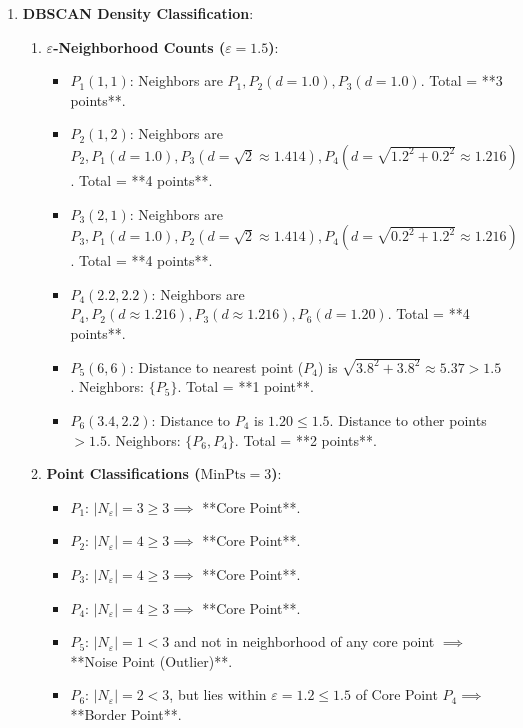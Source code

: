 \begin{enumerate}
    \item \textbf{DBSCAN Density Classification}:
    \begin{enumerate}[label=(\alph*)]
        \item \textbf{$\varepsilon$-Neighborhood Counts ($\varepsilon = 1.5$)}:
        \begin{itemize}
            \item $P_1(1, 1)$: Neighbors are $P_1, P_2(d=1.0), P_3(d=1.0)$. Total = **3 points**.
            \item $P_2(1, 2)$: Neighbors are $P_2, P_1(d=1.0), P_3(d=\sqrt{2} \approx 1.414), P_4(d=\sqrt{1.2^2+0.2^2} \approx 1.216)$. Total = **4 points**.
            \item $P_3(2, 1)$: Neighbors are $P_3, P_1(d=1.0), P_2(d=\sqrt{2} \approx 1.414), P_4(d=\sqrt{0.2^2+1.2^2} \approx 1.216)$. Total = **4 points**.
            \item $P_4(2.2, 2.2)$: Neighbors are $P_4, P_2(d \approx 1.216), P_3(d \approx 1.216), P_6(d=1.20)$. Total = **4 points**.
            \item $P_5(6, 6)$: Distance to nearest point ($P_4$) is $\sqrt{3.8^2+3.8^2} \approx 5.37 > 1.5$. Neighbors: $\{P_5\}$. Total = **1 point**.
            \item $P_6(3.4, 2.2)$: Distance to $P_4$ is $1.20 \le 1.5$. Distance to other points $> 1.5$. Neighbors: $\{P_6, P_4\}$. Total = **2 points**.
        \end{itemize}

        \item \textbf{Point Classifications ($\text{MinPts} = 3$)}:
        \begin{itemize}
            \item $P_1$: $|N_\varepsilon| = 3 \ge 3 \implies$ **Core Point**.
            \item $P_2$: $|N_\varepsilon| = 4 \ge 3 \implies$ **Core Point**.
            \item $P_3$: $|N_\varepsilon| = 4 \ge 3 \implies$ **Core Point**.
            \item $P_4$: $|N_\varepsilon| = 4 \ge 3 \implies$ **Core Point**.
            \item $P_5$: $|N_\varepsilon| = 1 < 3$ and not in neighborhood of any core point $\implies$ **Noise Point (Outlier)**.
            \item $P_6$: $|N_\varepsilon| = 2 < 3$, but lies within $\varepsilon = 1.2 \le 1.5$ of Core Point $P_4 \implies$ **Border Point**.
        \end{itemize}
    \end{enumerate}


\end{enumerate}
